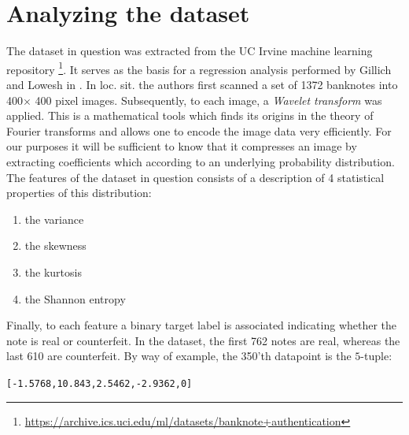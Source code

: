 \documentclass[14pt]{article}
\theoremstyle{plain}
\theoremstyle{definition}
\begin{document}
\section{Analyzing the dataset}
The dataset in question was extracted from the UC Irvine machine learning repository \footnote{\url{https://archive.ics.uci.edu/ml/datasets/banknote+authentication}}. It serves as the basis for a regression analysis performed by Gillich and Lowesh in \cite{BNA}. In loc. sit. the authors first scanned a set of 1372 banknotes into 400$\times$ 400 pixel images. Subsequently, to each image, a \emph{Wavelet transform} was applied. This is a mathematical tools which finds its origins in the theory of Fourier transforms and allows one to encode the image data very efficiently. For our purposes it will be sufficient to know that it compresses an image by extracting coefficients which according to an underlying probability distribution. The features of the dataset in question consists of a description of 4 statistical properties of this distribution:
\begin{enumerate}
\item the variance
\item the skewness
\item the kurtosis	
\item the Shannon entropy
\end{enumerate}
Finally, to each feature a binary target label is associated indicating whether the note is real or counterfeit. In the dataset, the first 762 notes are real, whereas the last 610 are counterfeit. By way of example, the 350'th datapoint is the $5$-tuple:

\begin{center}
\texttt{[-1.5768,10.843,2.5462,-2.9362,0]
}	
\end{center}
\end{document}
